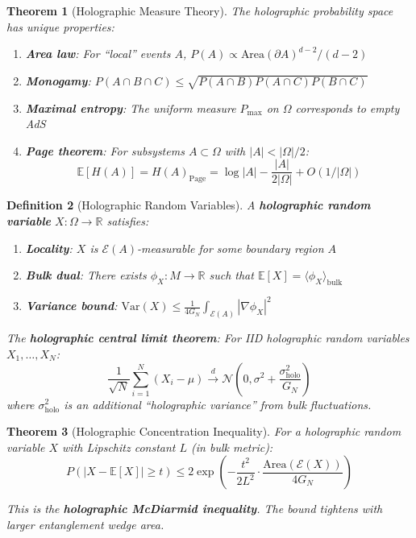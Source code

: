 \documentclass[12pt,a4paper]{article}
\newtheorem{theorem}{Theorem}[section]
\newtheorem{definition}[theorem]{Definition}
\begin{document}
\begin{theorem}[Holographic Measure Theory]\label{thm:holo-measure}
The holographic probability space has unique properties:
\begin{enumerate}
    \item \textbf{Area law}: For ``local'' events $A$, $P(A) \propto \text{Area}(\partial A)^{d-2}/(d-2)$
    \item \textbf{Monogamy}: $P(A \cap B \cap C) \leq \sqrt{P(A \cap B) P(A \cap C) P(B \cap C)}$
    \item \textbf{Maximal entropy}: The uniform measure $P_{\text{max}}$ on $\Omega$ corresponds to empty AdS
    \item \textbf{Page theorem}: For subsystems $A \subset \Omega$ with $|A| < |\Omega|/2$:
    \begin{equation}
    \mathbb{E}[H(A)] = H(A)_{\text{Page}} = \log|A| - \frac{|A|}{2|\Omega|} + O(1/|\Omega|)
    \end{equation}
\end{enumerate}
\end{theorem}

\begin{definition}[Holographic Random Variables]\label{def:holo-rv}
A \textbf{holographic random variable} $X: \Omega \to \mathbb{R}$ satisfies:
\begin{enumerate}
    \item \textbf{Locality}: $X$ is $\mathcal{E}(A)$-measurable for some boundary region $A$
    \item \textbf{Bulk dual}: There exists $\phi_X : M \to \mathbb{R}$ such that $\mathbb{E}[X] = \langle \phi_X \rangle_{\text{bulk}}$
    \item \textbf{Variance bound}: $\text{Var}(X) \leq \frac{1}{4G_N} \int_{\mathcal{E}(A)} |\nabla\phi_X|^2$
\end{enumerate}

The \textbf{holographic central limit theorem}: For IID holographic random variables $X_1, \ldots, X_N$:
\begin{equation}
\frac{1}{\sqrt{N}} \sum_{i=1}^N (X_i - \mu) \xrightarrow{d} \mathcal{N}\left(0, \sigma^2 + \frac{\sigma_{\text{holo}}^2}{G_N}\right)
\end{equation}
where $\sigma_{\text{holo}}^2$ is an additional ``holographic variance'' from bulk fluctuations.
\end{definition}

\begin{theorem}[Holographic Concentration Inequality]\label{thm:holo-concentration}
For a holographic random variable $X$ with Lipschitz constant $L$ (in bulk metric):
\begin{equation}
P(|X - \mathbb{E}[X]| \geq t) \leq 2\exp\left( -\frac{t^2}{2L^2} \cdot \frac{\text{Area}(\mathcal{E}(X))}{4G_N} \right)
\end{equation}

This is the \textbf{holographic McDiarmid inequality}. The bound tightens with larger entanglement wedge area.
\end{theorem}
\end{document}
